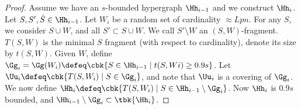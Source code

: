 \documentclass[a4paper, 11pt, oneside]{book}
\begin{document}
\begin{proof}
	Assume we have an $s$-bounded hypergraph $\Hh_{i-1}$ and we construct $\Hh_{i}$. Let $S,S',\hat{S}\in \Hh_{i-1}$. Let $W_i$ be a random set of cardinality $\approx Lpn$. For any $S$, we consider $S\cup W$, and all $S'\subset S\cup W$. We call $S'\setminus W$ an $(S,W)$-fragment. $T(S,W)$ is the minimal $S$ fragment (with respect to cardinality), denote its size by $t(S,W)$. Given $W$, define $\Gg_i = \Gg(W_i)\defeq \cbk{S\in \Hh_{i-1}\mid t(S,Wi) \ge 0.9s}$. Let $\Uu_i \defeq \cbk{T(S,W_i)\mid S\in \Gg_i}$, and note that $\Uu_i$ is a covering of $\Gg_i$. We now define $\Hh_i \defeq \cbk{T(S,W_i)\mid S\in \Hh_{i-1}\setminus \Gg_i}$. Now $\Hh_i$ is $0.9s$ bounded, and $\Hh_{i-1}\setminus \Gg_i\subset \tbk{\Hh_i}$.

\end{proof}
\end{document}
